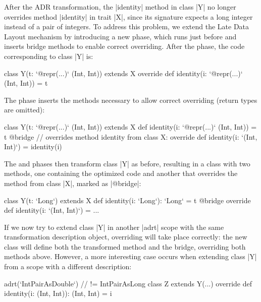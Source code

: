 After the ADR transformation, the |identity| method in class |Y| no longer overrides method |identity| in trait |X|, since its signature expects a long integer instead of a pair of integers. To address this problem, we extend the Late Data Layout mechanism by introducing a new \bridge{} phase, which runs just before \coerce{} and inserts bridge methods to enable correct overriding. After the \inject{} phase, the code corresponding to class |Y| is:

\begin{lstlisting-nobreak}
class Y(t: `@repr(...)` (Int, Int)) extends X {
  override def identity(i: `@repr(...)` (Int, Int)) = t
}
\end{lstlisting-nobreak}

The \bridge{} phase inserts the methods necessary to allow correct overriding (return types are omitted):

\begin{lstlisting-nobreak}
class Y(t: `@repr(...)` (Int, Int)) extends X {
  def identity(i: `@repr(...)` (Int, Int)) = t
  @bridge // overrides method identity from class X:
  override def identity(i: `(Int, Int)`) = identity(i)
}
\end{lstlisting-nobreak}

The \coerce{} and \commit{} phases then transform class |Y| as before, resulting in a class with two methods, one containing the optimized code and another that overrides the method from class |X|, marked as |@bridge|:

\begin{lstlisting-nobreak}
class Y(t: `Long`) extends X {
  def identity(i: `Long`): `Long` = t
  @bridge override def identity(i: `(Int, Int)`) = ...
}
\end{lstlisting-nobreak}

If we now try to extend class |Y| in another |adrt| scope with the same transformation description object, overriding will take place correctly: the new class will define both the transformed method and the bridge, overriding both methods above. However, a more interesting case occurs when extending class |Y| from a scope with a different description:

\begin{lstlisting-nobreak}
adrt(`IntPairAsDouble`) { // != IntPairAsLong
  class Z extends Y(...) {
    override def identity(i: (Int, Int)): (Int, Int) = i
  }
}
\end{lstlisting-nobreak}

